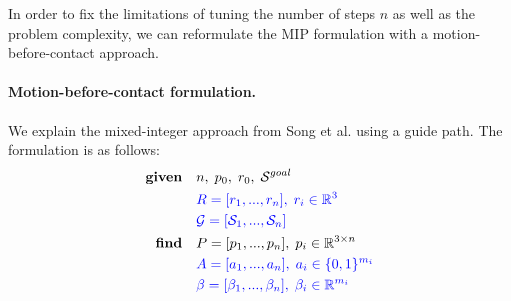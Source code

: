 In order to fix the limitations of tuning the number of steps $n$ as well as the problem complexity, we can reformulate the MIP formulation with a motion-before-contact approach.


\paragraph{Motion-before-contact formulation.\label{par:mip:mbc:formulation}}
We explain the mixed-integer approach from Song et al. \cite{sl1m_v2} using a guide path. 
The formulation is as follows:
\begin{align}
    \textrm{\textbf{given}} %
                            \quad & n, \; p_0, \; r_0, \; \mathcal{S}^{goal} \nonumber\\
                            \quad & \textcolor{blue}{R=[r_1,...,r_n], \; r_i \in \mathbb{R}^{3}} \label{eq:mbc:mip_complete:rotation}\\
                            \quad & \textcolor{blue}{\mathcal{G}=[\mathcal{S}_1, ..., \mathcal{S}_n]} \label{eq:mbc:mip_complete:surf_pruned}\\
    \textrm{\textbf{find}}  \quad & P=[p_1,...,p_n], \; p_i \in \mathbb{R}^{3 \times n} \nonumber\\
                            \quad & \textcolor{blue}{A=[a_1,...,a_n], \; a_i \in \{0,1\}^{m_i}} \label{eq:mbc:mip_complete:slack_pruned}\\
                            \quad & \textcolor{blue}{\beta=[\beta_1,...,\beta_n], \; \beta_i \in \mathbb{R}^{m_i}} \nonumber\\

\end{align}
